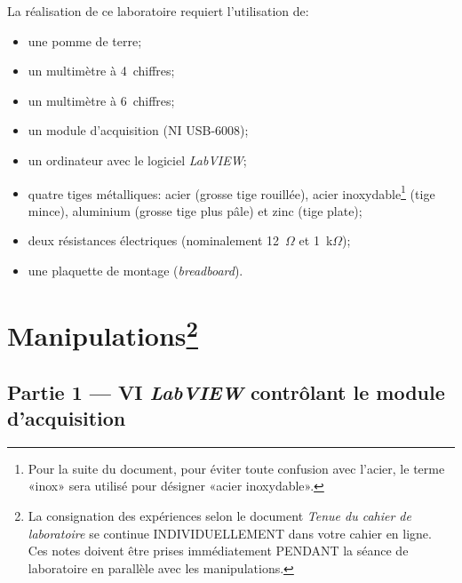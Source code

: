 \documentclass[canadien,12pt,oneside,letterpaper]{article}
\begin{document}
\noindent La réalisation de ce laboratoire requiert l'utilisation de:
\vspace{1ex}
\begin{itemize} \itemsep5pt
\item une pomme de terre;
\item un multimètre à 4\textonehalf~chiffres;
\item un multimètre à 6\textonehalf~chiffres;
\item un module d'acquisition (NI USB-6008);
\item un ordinateur avec le logiciel \textit{LabVIEW};
\item quatre tiges métalliques: acier (grosse tige rouillée), acier inoxydable\footnote{Pour la suite du document, pour éviter toute confusion avec l'acier, le terme «inox» sera utilisé pour désigner «acier inoxydable».} (tige mince), aluminium (grosse tige plus pâle) et zinc (tige plate);
\item deux résistances électriques (nominalement 12~$\Omega$ et 1~k$\Omega$);
\item une plaquette de montage (\textit{breadboard}).
\end{itemize}

\section[]{Manipulations\footnote{La consignation des expériences selon le document \textit{Tenue du cahier de laboratoire} se continue INDIVIDUELLEMENT dans votre cahier en ligne. Ces notes doivent être prises immédiatement PENDANT la séance de laboratoire en parallèle avec les manipulations.}}

\setlength{\parskip}{1ex plus 0.5ex minus 0.2ex}




\subsection{Partie 1 --- VI \textit{LabVIEW} contrôlant le module d'acquisition}
\end{document}
